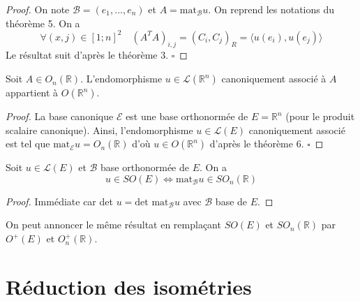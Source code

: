 \begin{proof}

On note $\mathcal{B} = (e_1, ..., e_n)$ et $A = \text{mat}_{\mathcal{B}} u$. On reprend les notations du théorème 5. On a
\[ \forall (x, j) \in [1; n]^2 \quad (A^T A)_{i,j} = (C_i, C_j)_{R} = \langle u(e_i), u(e_j) \rangle \]
Le résultat suit d'après le théorème 3. \hfill $\square$

\end{proof}

\begin{corollary}
\label{cor:1}

Soit $A \in O_n(\mathbb{R})$. L'endomorphisme $u \in \mathcal{L}(\mathbb{R}^n)$ canoniquement associé à $A$ appartient à $O(\mathbb{R}^n)$.

\end{corollary}

\begin{proof}

La base canonique $\mathcal{E}$ est une base orthonormée de $E = \mathbb{R}^n$ (pour le produit scalaire canonique). Ainsi, l'endomorphisme $u \in \mathcal{L}(E)$ canoniquement associé est tel que $\text{mat}_{\mathcal{E}} u = O_n(\mathbb{R})$ d'où $u \in O(\mathbb{R}^n)$ d'après le théorème 6. \hfill $\square$

\end{proof}

\begin{corollary}
\label{cor:2}

Soit $u \in \mathcal{L}(E)$ et $\mathcal{B}$ base orthonormée de $E$. On a
\[ u \in SO(E) \iff \text{mat}_{\mathcal{B}} u \in SO_n(\mathbb{R}) \]

\end{corollary}

\begin{proof}

Immédiate car det $u = \text{det mat}_{\mathcal{B}} u$ avec $\mathcal{B}$ base de $E$.

\end{proof}

\begin{remark}

On peut annoncer le même résultat en remplaçant $SO(E)$ et $SO_n(\mathbb{R})$ par $O^+(E)$ et $O_n^+(\mathbb{R})$.

\end{remark}

\section{Réduction des isométries}

